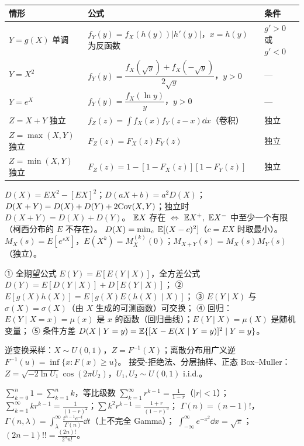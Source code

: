 \documentclass[UTF8,12pt,a4paper]{ctexart}
\begin{document}
\begin{center}\footnotesize
\begin{tabular}{p{1.87cm}p{4.23cm}p{2.53cm}}\hline
情形 & 公式 & 条件\\\hline
$Y=g(X)$ 单调 & $f_Y(y)=f_X(h(y))|h'(y)|$，$x=h(y)$ 为反函数 & $g'>0$ 或 $g'<0$\\
$Y=X^2$ & $f_Y(y)=\dfrac{f_X(\sqrt y)+f_X(-\sqrt y)}{2\sqrt y}$，$y>0$ & ---\\
$Y=e^X$ & $f_Y(y)=\dfrac{f_X(\ln y)}{y}$，$y>0$ & ---\\
$Z=X+Y$ 独立 & $f_Z(z)=\int f_X(x)f_Y(z-x)\dd x$（卷积） & 独立\\
$Z=\max(X,Y)$ 独立 & $F_Z(z)=F_X(z)F_Y(z)$ & 独立\\
$Z=\min(X,Y)$ 独立 & $F_Z(z)=1-[1-F_X(z)][1-F_Y(z)]$ & 独立\\\hline
\end{tabular}\end{center}

 $D(X)=E X^2-[EX]^2$；$D(aX+b)=a^2D(X)$；$D(X+Y)=D(X)+D(Y)+2\mathrm{Cov}(X,Y)$；独立时 $D(X+Y)=D(X)+D(Y)$。
 $\mathbb{E} X$ 存在 $\iff$ $\mathbb{E} X^+,\ \mathbb{E} X^-$ 中至少一个有限（柯西分布的 $E$ 不存在）。
 $D(X)=\min_c\;\mathbb{E}[(X-c)^2]$（$c=EX$ 时取最小）。
 $M_X(s)=E[e^{sX}]$，$E(X^k)=M_X^{(k)}(0)$；$M_{X+Y}(s)=M_X(s)M_Y(s)$（独立）。

① 全期望公式 $E(Y)=E[E(Y\mid X)]$，全方差公式 $D(Y)=E[D(Y\mid X)]+D[E(Y\mid X)]$；
② $E[g(X)h(X)]=E[g(X)E(h(X)\mid X)]$；
③ $E(Y\mid X)$ 与 $\sigma(X)=\sigma(X)$（由 $X$ 生成的可测函数）可交换；
④ 回归：$E(Y\mid X=x)=\mu(x)$ 是 $x$ 的函数（回归曲线）；$E(Y\mid X)=\mu(X)$ 是随机变量；
⑤ 条件方差 $D(X\mid Y=y)=\mathbb{E}\{[X-E(X\mid Y=y)]^2\mid Y=y\}$。

逆变换采样：$X\sim U(0,1)$，$Z=F^{-1}(X)$；离散分布用广义逆 $F^{-1}(u)=\inf\{x:F(x)\ge u\}$。
接受-拒绝法、分层抽样、正态 Box--Muller：$Z=\sqrt{-2\ln U_1}\cos(2\pi U_2)$，$U_1,U_2\sim U(0,1)$ i.i.d.。

$\sum_{k=0}^{n}1=\sum_{k=1}^n k$，等比级数 $\sum_{k=1}^{\infty}r^{k-1}=\frac1{1-r}$（$|r|<1$）；
$\sum_{k=1}^{\infty}k r^{k-1}=\frac1{(1-r)^2}$；$\sum k^2r^{k-1}=\frac{1+r}{(1-r)^3}$；
$\Gamma(n)=(n-1)!$，$\Gamma(n,\lambda)=\int_\lambda^\infty \frac{t^{n-1}e^{-t}}{\Gamma(n)}\dd t$（上不完全 Gamma）；
$\int_{-\infty}^{\infty}e^{-x^2}\dd x=\sqrt\pi$；$(2n-1)!!=\frac{(2n)!}{2^n n!}$。
\end{document}
